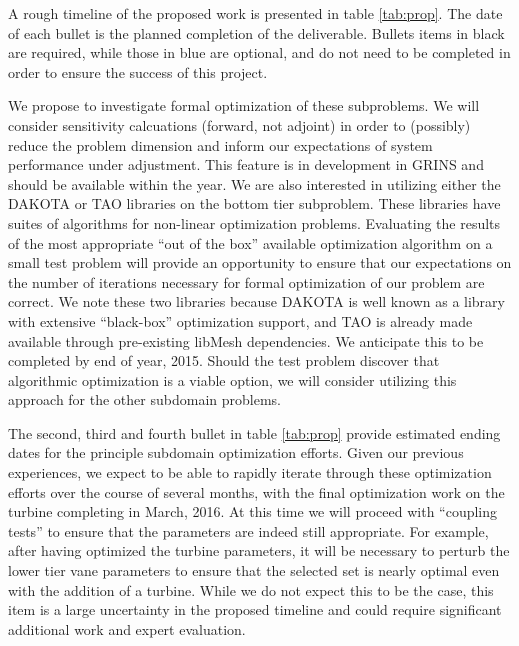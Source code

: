 

%
%
A rough timeline of the proposed work is presented in table
\ref{tab:prop}. The date of each bullet is the planned completion of the
deliverable. Bullets items in black are required, while those in blue
are optional, and do not need to be completed in order to ensure the
success of this project. 

% 
% 
We propose to investigate formal optimization of these subproblems. 
We will consider sensitivity calcuations (forward, not adjoint) in order
to (possibly) reduce the problem dimension and inform our expectations
of system performance under adjustment. This feature is in development
in GRINS and should be available within the year. We are also interested
in utilizing either the DAKOTA\cite{adams2013dakota} or
TAO\cite{tao-user-ref} libraries on the bottom tier subproblem. These
libraries have suites of algorithms for non-linear optimization
problems. Evaluating the results of the most appropriate ``out of the
box'' available optimization algorithm on a small test problem will
provide an opportunity to ensure that our expectations on the number of
iterations necessary for formal optimization of our problem are correct. 
We note these two libraries because DAKOTA is well known as a library
with extensive ``black-box'' optimization support, and TAO is already
made available through pre-existing libMesh dependencies. We anticipate
this to be completed by end of year, 2015. Should the test problem
discover that algorithmic optimization is a viable option, we will
consider utilizing this approach for the other subdomain problems. 
%
%

The second, third and fourth bullet in table \ref{tab:prop} provide
estimated ending dates for the principle subdomain optimization
efforts. Given our previous experiences, we expect to be able to rapidly
iterate through these optimization efforts over the course of several
months, with the final optimization work on the turbine completing in
March, 2016. At this time we will proceed with ``coupling tests'' to
ensure that the parameters are indeed still appropriate. For example,
after having optimized the turbine parameters, it will be necessary to
perturb the lower tier vane parameters to ensure that the selected set
is nearly optimal even with the addition of a turbine. While we do not
expect this to be the case, this item is a large uncertainty in the
proposed timeline and could
require significant additional work and expert evaluation. 

